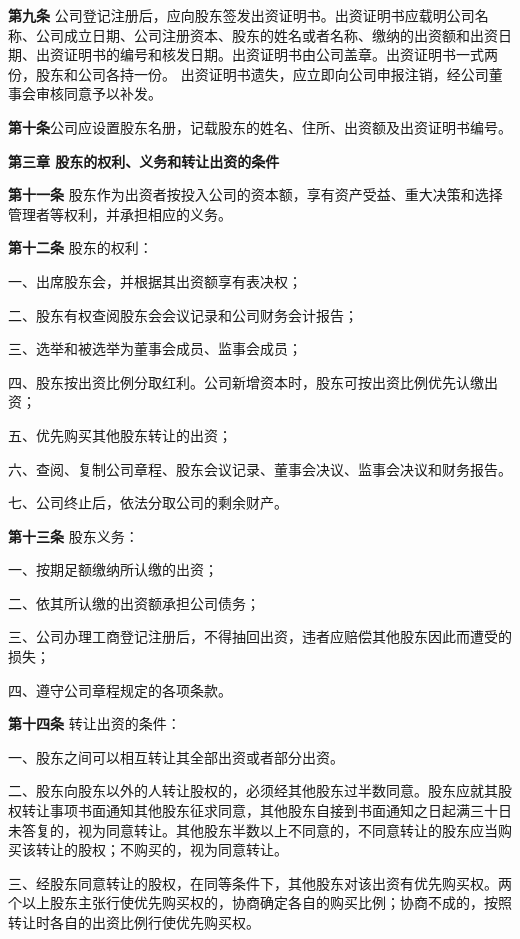 \textbf{第九条} \quad 公司登记注册后，应向股东签发出资证明书。出资证明书应载明公司名称、公司成立日期、公司注册资本、股东的姓名或者名称、缴纳的出资额和出资日期、出资证明书的编号和核发日期。出资证明书由公司盖章。出资证明书一式两份，股东和公司各持一份。
出资证明书遗失，应立即向公司申报注销，经公司董事会审核同意予以补发。

\textbf{第十条}\quad  公司应设置股东名册，记载股东的姓名、住所、出资额及出资证明书编号。


\begin{center}
\textbf{第三章 \quad  股东的权利、义务和转让出资的条件}
\end{center}

\textbf{第十一条} \quad 股东作为出资者按投入公司的资本额，享有资产受益、重大决策和选择管理者等权利，并承担相应的义务。

\textbf{第十二条} \quad 股东的权利：

    一、出席股东会，并根据其出资额享有表决权；

    二、股东有权查阅股东会会议记录和公司财务会计报告；

    三、选举和被选举为董事会成员、监事会成员；

    四、股东按出资比例分取红利。公司新增资本时，股东可按出资比例优先认缴出资；

    五、优先购买其他股东转让的出资；

六、查阅、复制公司章程、股东会议记录、董事会决议、监事会决议和财务报告。

七、公司终止后，依法分取公司的剩余财产。

\textbf{第十三条} \quad 股东义务：

    一、按期足额缴纳所认缴的出资；

    二、依其所认缴的出资额承担公司债务；

    三、公司办理工商登记注册后，不得抽回出资，违者应赔偿其他股东因此而遭受的损失；

四、遵守公司章程规定的各项条款。

\textbf{ 第十四条} \quad 转让出资的条件：

    一、股东之间可以相互转让其全部出资或者部分出资。

    二、股东向股东以外的人转让股权的，必须经其他股东过半数同意。股东应就其股权转让事项书面通知其他股东征求同意，其他股东自接到书面通知之日起满三十日未答复的，视为同意转让。其他股东半数以上不同意的，不同意转让的股东应当购买该转让的股权；不购买的，视为同意转让。

    三、经股东同意转让的股权，在同等条件下，其他股东对该出资有优先购买权。两个以上股东主张行使优先购买权的，协商确定各自的购买比例；协商不成的，按照转让时各自的出资比例行使优先购买权。

